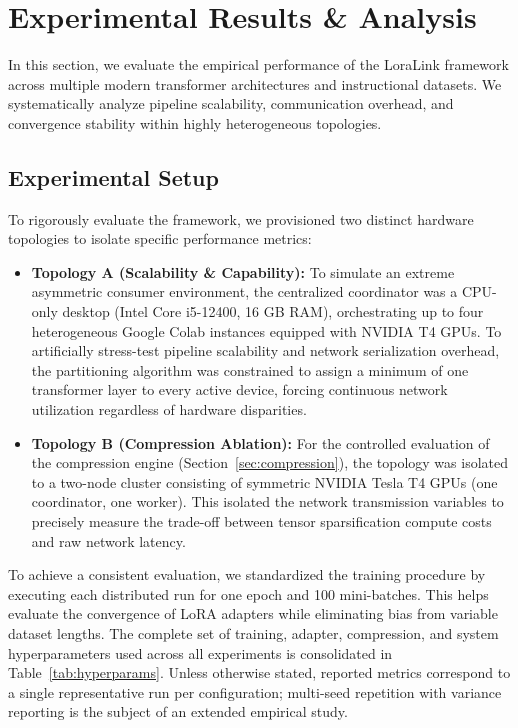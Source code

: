 \documentclass{ieeeaccess}
\begin{document}
\section{Experimental Results \& Analysis}
\label{sec:results}

In this section, we evaluate the empirical performance of the LoraLink framework across multiple modern transformer architectures and instructional datasets. We systematically analyze pipeline scalability, communication overhead, and convergence stability within highly heterogeneous topologies.

\subsection{Experimental Setup}
To rigorously evaluate the framework, we provisioned two distinct hardware topologies to isolate specific performance metrics:
\begin{itemize}
    \item \textbf{Topology A (Scalability \& Capability):} To simulate an extreme asymmetric consumer environment, the centralized coordinator was a CPU-only desktop (Intel Core i5-12400, 16 GB RAM), orchestrating up to four heterogeneous Google Colab instances equipped with NVIDIA T4 GPUs. To artificially stress-test pipeline scalability and network serialization overhead, the partitioning algorithm was constrained to assign a minimum of one transformer layer to every active device, forcing continuous network utilization regardless of hardware disparities.
    \item \textbf{Topology B (Compression Ablation):} For the controlled evaluation of the compression engine (Section~\ref{sec:compression}), the topology was isolated to a two-node cluster consisting of symmetric NVIDIA Tesla T4 GPUs (one coordinator, one worker). This isolated the network transmission variables to precisely measure the trade-off between tensor sparsification compute costs and raw network latency.
\end{itemize}

To achieve a consistent evaluation, we standardized the training procedure by executing each distributed run for one epoch and 100 mini-batches. This helps evaluate the convergence of LoRA adapters while eliminating bias from variable dataset lengths. The complete set of training, adapter, compression, and system hyperparameters used across all experiments is consolidated in Table~\ref{tab:hyperparams}. Unless otherwise stated, reported metrics correspond to a single representative run per configuration; multi-seed repetition with variance reporting is the subject of an extended empirical study.
\end{document}
